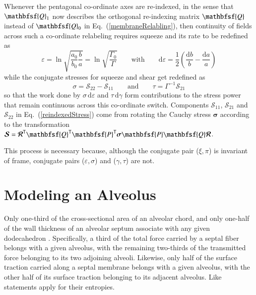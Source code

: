 Whenever the pentagonal co-ordinate axes are re-indexed, in the sense that $\mathbfsf{Q}_1$ now describes the orthogonal re-indexing matrix $\mathbfsf{Q}$ instead of $\mathbfsf{Q}_0$ in Eq.~(\ref{membraneRelabling}), then continuity of fields across such a co-ordinate relabeling requires squeeze and its rate to be redefined as
\begin{equation}
\varepsilon = \ln \sqrt{\frac{a_0}{b_0} \frac{b}{a}} = 
\ln \sqrt{\frac{\Gamma_0}{\Gamma}}
\qquad \text{with} \qquad
\mathrm{d} \varepsilon = \frac{1}{2} 
\left( \frac{\mathrm{d}b}{b} - \frac{\mathrm{d}a}{a} \right)
\label{reindexedSqueeze}
\end{equation}
while the conjugate stresses for squeeze and shear get redefined as
\begin{equation}
\sigma = \mathcal{S}_{22} -  \mathcal{S}_{11}
\qquad \text{and} \qquad
\tau = \Gamma^{-1} \mathcal{S}_{21}
\label{reindexedStress}
\end{equation}
so that the work done by $\sigma \, \mathrm{d} \varepsilon$ and $\tau \, \mathrm{d} \gamma$ form contributions to the stress power that remain continuous across this co-ordinate switch.  Components $\mathcal{S}_{11}$, $\mathcal{S}_{21}$ and $\mathcal{S}_{22}$ in Eq.~(\ref{reindexedStress}) come from rotating the Cauchy stress $\boldsymbol{\sigma}$ according to the transformation $\boldsymbol{\mathcal{S}} = \boldsymbol{\mathcal{R}}^{\mathsf{T}} \mathbfsf{Q}^{\mathsf{T}} \mathbfsf{P}^{\mathsf{T}} \boldsymbol{\sigma} \mathbfsf{P} \mathbfsf{Q} \boldsymbol{\mathcal{R}}$.  

This process is necessary because, although the conjugate pair ($\xi , \pi$) is invariant of frame, conjugate pairs ($\varepsilon , \sigma$) and ($\gamma , \tau$) are not.

\section{Modeling an Alveolus}
\label{secAlveolus}

Only one-third of the cross-sectional area of an alveolar chord, and only one-half of the wall thickness of an alveolar septum associate with any given dodecahedron \cite{Kimmeletal87}.  Specifically, a third of the total force carried by a  septal fiber belongs with a given alveolus, with the remaining two-thirds of the transmitted force belonging to its two adjoining alveoli.  Likewise, only half of the surface traction carried along a septal membrane belongs with a given alveolus, with the other half of its surface traction belonging to its adjacent alveolus.  Like statements apply for their entropies.


